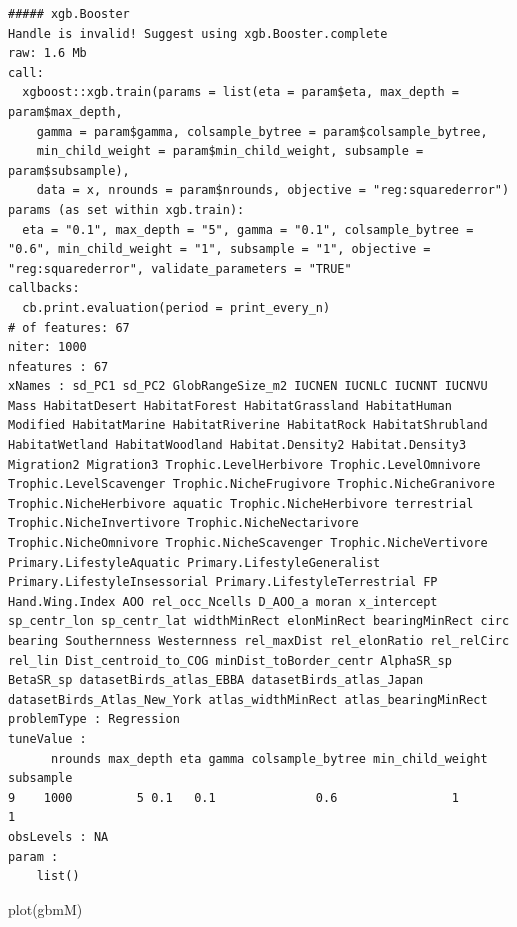 \documentclass[
  letterpaper,
  DIV=11,
  numbers=noendperiod]{scrreprt}
\newenvironment{Shaded}{\begin{snugshade}}{\end{snugshade}}
\newcommand{\FunctionTok}[1]{\textcolor[rgb]{0.28,0.35,0.67}{#1}}
\newcommand{\NormalTok}[1]{\textcolor[rgb]{0.00,0.23,0.31}{#1}}
\begin{document}
\begin{verbatim}
##### xgb.Booster
Handle is invalid! Suggest using xgb.Booster.complete
raw: 1.6 Mb 
call:
  xgboost::xgb.train(params = list(eta = param$eta, max_depth = param$max_depth, 
    gamma = param$gamma, colsample_bytree = param$colsample_bytree, 
    min_child_weight = param$min_child_weight, subsample = param$subsample), 
    data = x, nrounds = param$nrounds, objective = "reg:squarederror")
params (as set within xgb.train):
  eta = "0.1", max_depth = "5", gamma = "0.1", colsample_bytree = "0.6", min_child_weight = "1", subsample = "1", objective = "reg:squarederror", validate_parameters = "TRUE"
callbacks:
  cb.print.evaluation(period = print_every_n)
# of features: 67 
niter: 1000
nfeatures : 67 
xNames : sd_PC1 sd_PC2 GlobRangeSize_m2 IUCNEN IUCNLC IUCNNT IUCNVU Mass HabitatDesert HabitatForest HabitatGrassland HabitatHuman Modified HabitatMarine HabitatRiverine HabitatRock HabitatShrubland HabitatWetland HabitatWoodland Habitat.Density2 Habitat.Density3 Migration2 Migration3 Trophic.LevelHerbivore Trophic.LevelOmnivore Trophic.LevelScavenger Trophic.NicheFrugivore Trophic.NicheGranivore Trophic.NicheHerbivore aquatic Trophic.NicheHerbivore terrestrial Trophic.NicheInvertivore Trophic.NicheNectarivore Trophic.NicheOmnivore Trophic.NicheScavenger Trophic.NicheVertivore Primary.LifestyleAquatic Primary.LifestyleGeneralist Primary.LifestyleInsessorial Primary.LifestyleTerrestrial FP Hand.Wing.Index AOO rel_occ_Ncells D_AOO_a moran x_intercept sp_centr_lon sp_centr_lat widthMinRect elonMinRect bearingMinRect circ bearing Southernness Westernness rel_maxDist rel_elonRatio rel_relCirc rel_lin Dist_centroid_to_COG minDist_toBorder_centr AlphaSR_sp BetaSR_sp datasetBirds_atlas_EBBA datasetBirds_atlas_Japan datasetBirds_Atlas_New_York atlas_widthMinRect atlas_bearingMinRect 
problemType : Regression 
tuneValue :
      nrounds max_depth eta gamma colsample_bytree min_child_weight subsample
9    1000         5 0.1   0.1              0.6                1         1
obsLevels : NA 
param :
    list()
\end{verbatim}

\begin{Shaded}
\begin{Highlighting}[]
\FunctionTok{plot}\NormalTok{(gbmM)}
\end{Highlighting}
\end{Shaded}
\end{document}
